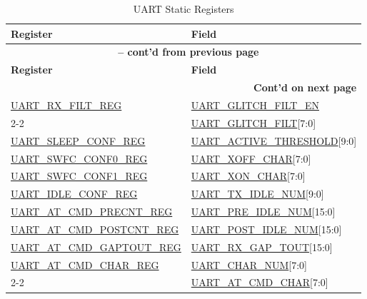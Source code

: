 \documentclass[main\_\_EN.tex]{subfiles}
\begin{document}
\begin{longtable}[c]{|p{6cm}|p{6cm}|}
\caption{UART Static Registers}
\label{tab:uart-static-reg} \\
    \hline
    \rowcolor{lightgray}
        \textbf{Register} & \textbf{Field} \\\hline
    \endfirsthead
        \multicolumn{2}{c}{\bfseries \tablename\ \thetable{} -- cont'd from previous page}\\\hline
        
    \rowcolor{lightgray}
        \textbf{Register} & \textbf{Field} \\\hline
    \endhead
        
        \multicolumn{2}{r}{\textbf{Cont'd on next page}} \\
    \endfoot
    \endlastfoot
    \hline
    
\hyperref[regdesc:UARTRXFILTREG]{UART\_RX\_FILT\_REG} & \hyperref[fielddesc:UARTGLITCHFILTEN]{UART\_GLITCH\_FILT\_EN} \\\cline{2-2}
 & \hyperref[fielddesc:UARTGLITCHFILT]{UART\_GLITCH\_FILT}[7:0] \\\hline
\hyperref[regdesc:UARTSLEEPCONFREG]{UART\_SLEEP\_CONF\_REG} & \hyperref[fielddesc:UARTACTIVETHRESHOLD]{UART\_ACTIVE\_THRESHOLD}[9:0] \\\hline
\hyperref[regdesc:UARTSWFCCONF0REG]{UART\_SWFC\_CONF0\_REG} & \hyperref[fielddesc:UARTXOFFCHAR]{UART\_XOFF\_CHAR}[7:0] \\\hline
\hyperref[regdesc:UARTSWFCCONF1REG]{UART\_SWFC\_CONF1\_REG} & \hyperref[fielddesc:UARTXONCHAR]{UART\_XON\_CHAR}[7:0] \\\hline
\hyperref[regdesc:UARTIDLECONFREG]{UART\_IDLE\_CONF\_REG} & \hyperref[fielddesc:UARTTXIDLENUM]{UART\_TX\_IDLE\_NUM}[9:0] \\\hline
\hyperref[regdesc:UARTATCMDPRECNTREG]{UART\_AT\_CMD\_PRECNT\_REG} & \hyperref[fielddesc:UARTPREIDLENUM]{UART\_PRE\_IDLE\_NUM}[15:0] \\\hline
\hyperref[regdesc:UARTATCMDPOSTCNTREG]{UART\_AT\_CMD\_POSTCNT\_REG} & \hyperref[fielddesc:UARTPOSTIDLENUM]{UART\_POST\_IDLE\_NUM}[15:0] \\\hline
\hyperref[regdesc:UARTATCMDGAPTOUTREG]{UART\_AT\_CMD\_GAPTOUT\_REG} & \hyperref[fielddesc:UARTRXGAPTOUT]{UART\_RX\_GAP\_TOUT}[15:0] \\\hline
\hyperref[regdesc:UARTATCMDCHARREG]{UART\_AT\_CMD\_CHAR\_REG} & \hyperref[fielddesc:UARTCHARNUM]{UART\_CHAR\_NUM}[7:0] \\\cline{2-2}
 & \hyperref[fielddesc:UARTATCMDCHAR]{UART\_AT\_CMD\_CHAR}[7:0] \\\hline
\end{longtable}
\end{document}
